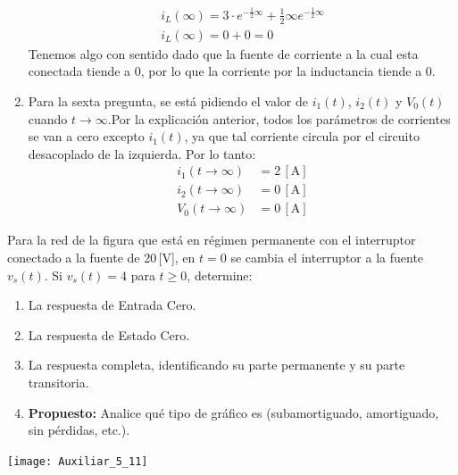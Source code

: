 \documentclass[
  11pt,
  letterpaper,
   addpoints,
   answers
  ]{exam}
\begin{document}
\begin{questions}
\begin{solution}
\begin{enumerate}
    \begin{align}
        i_{L}(\infty) = 3\cdot e^{-\frac{1}{2}\infty} + \frac{1}{2}\infty e^{-\frac{1}{2}\infty}\\
        i_{L}(\infty) = 0 + 0 = 0
    \end{align}
    Tenemos algo con sentido dado que la fuente de corriente a la cual esta conectada tiende a 0, por lo que la corriente por la inductancia tiende a 0.
    \item Para la sexta pregunta, se está pidiendo el valor de \( i_1(t) \), \( i_2(t) \) y \( V_0(t) \) cuando \( t \to \infty \).Por la explicación anterior, todos los parámetros de corrientes se van a cero excepto \( i_1(t) \), ya que tal corriente circula por el circuito desacoplado de la izquierda. Por lo tanto:
    \begin{align}
    i_1(t \to \infty) &= 2\,[\text{A}] \\
    i_2(t \to \infty) &= 0\,[\text{A}] \\
    V_0(t \to \infty) &= 0\,[\text{A}]
    \end{align}
    \end{enumerate}
\end{solution}
    \question
    Para la red de la figura que está en régimen permanente con el interruptor conectado a la fuente de 20\,[V], en \( t = 0 \) se cambia el interruptor a la fuente \( v_s(t) \). Si \( v_s(t) = 4 \) para \( t \geq 0 \), determine:

\begin{enumerate}
    \item La respuesta de Entrada Cero.
    \item La respuesta de Estado Cero.
    \item La respuesta completa, identificando su parte permanente y su parte transitoria.
    \item \textbf{Propuesto:} Analice qué tipo de gráfico es (subamortiguado, amortiguado, sin pérdidas, etc.).
\end{enumerate}
\begin{center}
    \texttt{[image: Auxiliar\_5\_11]}
\end{center}


\end{questions}
\end{document}
